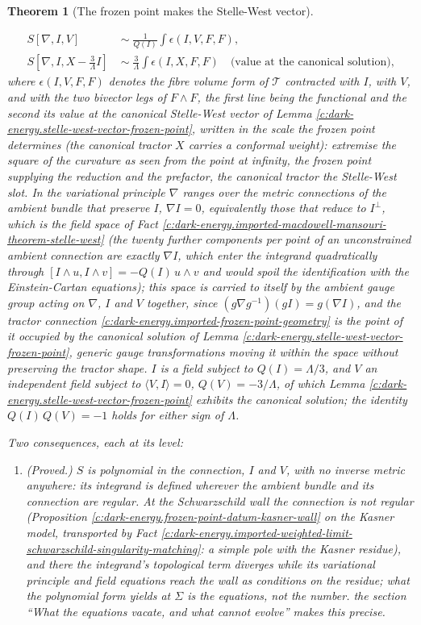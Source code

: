 \documentclass[11pt]{article}
\newtheorem{theorem}{Theorem}[section]
\theoremstyle{definition}
\theoremstyle{plain}
\providecommand{\ip}{}\renewcommand{\ip}[2]{\langle #1, #2\rangle}
\begin{document}
\begin{theorem}[The frozen point makes the Stelle-West vector]
\begin{enumerate}
\[
\begin{aligned}
S[\nabla, I, V] \;&\sim\; \frac{1}{Q(I)} \int \epsilon(I, V, F, F), \\
S[\nabla, I, X - \tfrac{3}{\Lambda}I] \;&\sim\; \frac{3}{\Lambda}\int \epsilon(I, X, F, F) \quad\text{(value at the canonical solution),}
\end{aligned}
\]
where $\epsilon(I, V, F, F)$ denotes the fibre volume form of $\mathcal{T}$ contracted with $I$, with $V$, and with the two bivector legs of $F\wedge F$, the first line being the functional and the second its value at the canonical Stelle-West vector of Lemma \ref{c:dark-energy.stelle-west-vector-frozen-point}, written in the scale the frozen point determines (the canonical tractor $X$ carries a conformal weight): \emph{extremise the square of the curvature as seen from the point at infinity}, the frozen point supplying the reduction and the prefactor, the canonical tractor the Stelle-West slot. In the variational principle $\nabla$ ranges over the metric connections of the ambient bundle that preserve $I$, $\nabla I = 0$, equivalently those that reduce to $I^\perp$, which is the field space of Fact \ref{c:dark-energy.imported-macdowell-mansouri-theorem-stelle-west} (the twenty further components per point of an unconstrained ambient connection are exactly $\nabla I$, which enter the integrand quadratically through $[I\wedge u, I\wedge v] = -Q(I)\,u\wedge v$ and would spoil the identification with the Einstein-Cartan equations); this space is carried to itself by the ambient gauge group acting on $\nabla$, $I$ and $V$ together, since $(g\nabla g^{-1})(gI) = g(\nabla I)$, and the tractor connection \ref{c:dark-energy.imported-frozen-point-geometry} is the point of it occupied by the canonical solution of Lemma \ref{c:dark-energy.stelle-west-vector-frozen-point}, generic gauge transformations moving it within the space without preserving the tractor shape. $I$ is a field subject to $Q(I) = \Lambda/3$, and $V$ an independent field subject to $\ip{V}{I} = 0$, $Q(V) = -3/\Lambda$, of which Lemma \ref{c:dark-energy.stelle-west-vector-frozen-point} exhibits the canonical solution; the identity $Q(I)\,Q(V) = -1$ holds for either sign of $\Lambda$.
\end{enumerate}
Two consequences, each at its level:
\begin{enumerate}
\item \emph{(Proved.)} $S$ is polynomial in the connection, $I$ and $V$, with no inverse metric anywhere: its integrand is defined wherever the ambient bundle and its connection are regular. At the Schwarzschild wall the connection is not regular (Proposition \ref{c:dark-energy.frozen-point-datum-kasner-wall} on the Kasner model, transported by Fact \ref{c:dark-energy.imported-weighted-limit-schwarzschild-singularity-matching}: a simple pole with the Kasner residue), and there the integrand's topological term diverges while its variational principle and field equations reach the wall as conditions on the residue; what the polynomial form yields at $\Sigma$ is the equations, not the number. the section ``What the equations vacate, and what cannot evolve'' makes this precise.

\end{enumerate}
\end{theorem}
\end{document}
